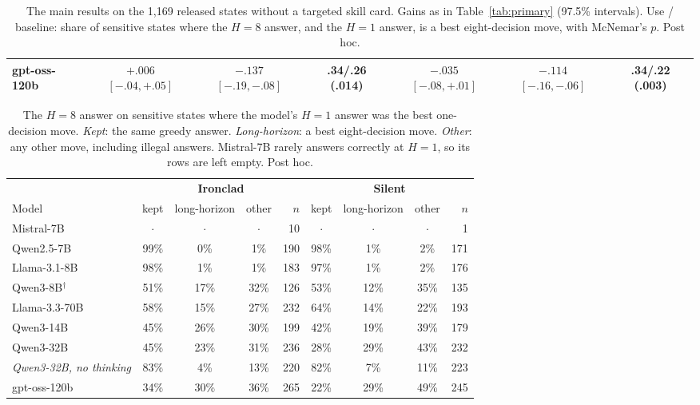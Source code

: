 \begin{table}[t]
{\begin{tabular}{@{}l ccc ccc@{}}
gpt-oss-120b & $+.006$ {\scriptsize$[-.04,+.05]$} & $-.137$ {\scriptsize$[-.19,-.08]$} & .34/.26 {\scriptsize(.014)} & $-.035$ {\scriptsize$[-.08,+.01]$} & $-.114$ {\scriptsize$[-.16,-.06]$} & .34/.22 {\scriptsize(.003)} \\
\bottomrule
\end{tabular}}
\caption{The main results on the 1,169 released states without a targeted skill card. Gains as in Table~\ref{tab:primary} (97.5\% intervals). Use / baseline: share of sensitive states where the $H{=}8$ answer, and the $H{=}1$ answer, is a best eight-decision move, with McNemar's $p$. Post hoc.}
\label{tab:clean}
\end{table}

\begin{table}[t]
\centering
\footnotesize
\begin{tabular}{@{}l cccr cccr@{}}
\toprule
& \multicolumn{4}{c}{\textbf{Ironclad}} & \multicolumn{4}{c}{\textbf{Silent}} \\
\cmidrule(lr){2-5}\cmidrule(l){6-9}
Model & kept & long-horizon & other & $n$ & kept & long-horizon & other & $n$ \\
\midrule
Mistral-7B & $\cdot$ & $\cdot$ & $\cdot$ & 10 & $\cdot$ & $\cdot$ & $\cdot$ & 1 \\
Qwen2.5-7B & 99\% & 0\% & 1\% & 190 & 98\% & 1\% & 2\% & 171 \\
Llama-3.1-8B & 98\% & 1\% & 1\% & 183 & 97\% & 1\% & 2\% & 176 \\
Qwen3-8B$^\dagger$ & 51\% & 17\% & 32\% & 126 & 53\% & 12\% & 35\% & 135 \\
Llama-3.3-70B & 58\% & 15\% & 27\% & 232 & 64\% & 14\% & 22\% & 193 \\
Qwen3-14B & 45\% & 26\% & 30\% & 199 & 42\% & 19\% & 39\% & 179 \\
Qwen3-32B & 45\% & 23\% & 31\% & 236 & 28\% & 29\% & 43\% & 232 \\
\textit{Qwen3-32B, no thinking} & 83\% & 4\% & 13\% & 220 & 82\% & 7\% & 11\% & 223 \\
gpt-oss-120b & 34\% & 30\% & 36\% & 265 & 22\% & 29\% & 49\% & 245 \\
\bottomrule
\end{tabular}
\caption{The $H{=}8$ answer on sensitive states where the model's $H{=}1$ answer was the best one-decision move. \emph{Kept}: the same greedy answer. \emph{Long-horizon}: a best eight-decision move. \emph{Other}: any other move, including illegal answers. Mistral-7B rarely answers correctly at $H{=}1$, so its rows are left empty. Post hoc.}
\label{tab:cond}
\end{table}


